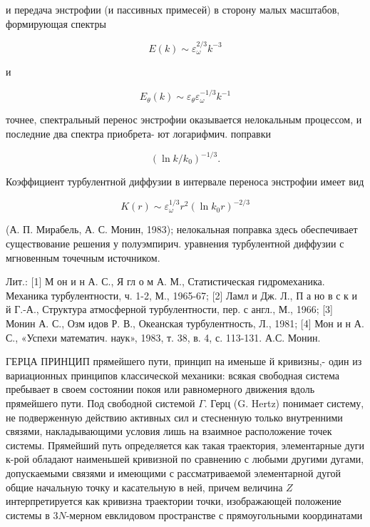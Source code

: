\documentclass[10pt]{article}
\begin{document}
и передача энстрофии (и пассивных примесей) в сторону малых масштабов, формирующая спектры



\[

E(k) \sim \varepsilon_{\omega}^{2 / 3} k^{-3}

\]



и



\[

E_{\theta}(k) \sim \varepsilon_{\theta} \varepsilon_{\omega}^{-1 / 3} k^{-1}

\]



точнее, спектральный перенос энстрофии оказывается нелокальным процессом, и последние два спектра приобрета- ют логарифмич. поправки



\[

\left(\ln k / k_{0}\right)^{-1 / 3} .

\]



Коэффициент турбулентной диффузии в интервале переноса энстрофии имеет вид



\[

K(r) \sim \varepsilon_{\omega}^{1 / 3} r^{2}\left(\ln k_{0} r\right)^{-2 / 3}

\]



(А. П. Мирабель, А. С. Монин, 1983); нелокальная поправка здесь обеспечивает существование решения у полуэмпирич. уравнения турбулентной диффузии с мгновенным точечным источником.



Лит.: [1] М он и н А. С., Я гл о м А. М., Статистическая гидромеханика. Механика турбулентности, ч. 1-2, М., 1965-67; [2] Ламл и Дж. Л., П а но в с к и й Г.-А., Структура атмосферной турбулентности, пер. с англ., М., 1966; [3] Монин А. С., Озм идов Р. В., Океанская турбулентность, Л., 1981; [4] Мон и н А. С., «Успехи математич. наук», 1983, т. 38, в. 4, с. 113-131. А.С. Монин.



ГЕРЦА ПРИНЦИП прямейшего пути, принцип на именьше й кривизны,- один из вариационных принципов классической механики: всякая свободная система пребывает в своем состоянии покоя или равномерного движения вдоль прямейшего пути. Под свободной системой $\Gamma$. Герц (G. Hertz) понимает систему, не подверженную действию активных сил и стесненную только внутренними связями, накладывающими условия лишь на взаимное расположение точек системы. Прямейший путь определяется как такая траектория, элементарные дуги к-рой обладают наименьшей кривизной по сравнению с любыми другими дугами, допускаемыми связями и имеющими с рассматриваемой элементарной дугой общие начальную точку и касательную в ней, причем величина $Z$ интерпретируется как кривизна траектории точки, изображающей положение системы в $3 N$-мерном евклидовом пространстве с прямоугольными координатами
\end{document}

